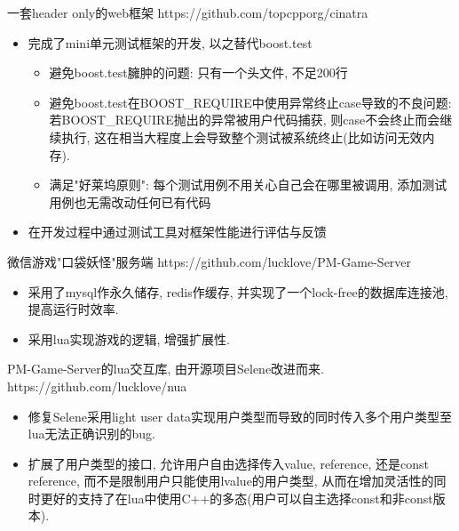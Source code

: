 \documentclass{resume}
\begin{document}
\begin{onehalfspacing}
一套header only的web框架 
\newline
https://github.com/topcpporg/cinatra
\begin{itemize}
  \item 完成了mini单元测试框架的开发, 以之替代boost.test
  \begin{itemize}
    \item 避免boost.test臃肿的问题: 只有一个头文件, 不足200行
    \item 避免boost.test在BOOST\_REQUIRE中使用异常终止case导致的不良问题: \newline 若BOOST\_REQUIRE抛出的异常被用户代码捕获, 则case不会终止而会继续执行, 这在相当大程度上会导致整个测试被系统终止(比如访问无效内存).
    \item 满足"好莱坞原则": 每个测试用例不用关心自己会在哪里被调用, 添加测试用例也无需改动任何已有代码
  \end{itemize}
  \item 在开发过程中通过测试工具对框架性能进行评估与反馈
\end{itemize}
\end{onehalfspacing}

\begin{onehalfspacing}
微信游戏"口袋妖怪"服务端
\newline
https://github.com/lucklove/PM-Game-Server
\begin{itemize}
  \item 采用了mysql作永久储存, redis作缓存, 并实现了一个lock-free的数据库连接池, 提高运行时效率.
  \item 采用lua实现游戏的逻辑, 增强扩展性.
\end{itemize}
\end{onehalfspacing}

\begin{onehalfspacing}
PM-Game-Server的lua交互库, 由开源项目Selene改进而来.
\newline
https://github.com/lucklove/nua
\begin{itemize}
  \item 修复Selene采用light user data实现用户类型而导致的同时传入多个用户类型至lua无法正确识别的bug.
  \item 扩展了用户类型的接口, 允许用户自由选择传入value, reference, 还是const reference, 而不是限制用户只能使用lvalue的用户类型, 从而在增加灵活性的同时更好的支持了在lua中使用C++的多态(用户可以自主选择const和非const版本).
\end{itemize}
\end{onehalfspacing}
\end{document}
